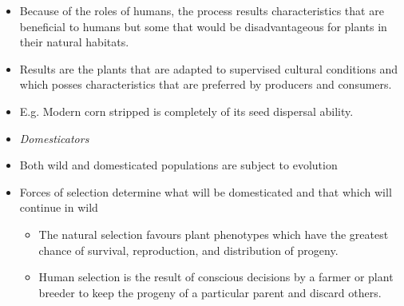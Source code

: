 \documentclass[11pt,ignorenonframetext,aspectratio=169]{beamer}
\providecommand{\tightlist}{%
  \setlength{\itemsep}{0pt}\setlength{\parskip}{0pt}}
\begin{document}
\begin{frame}{}
\protect\hypertarget{section-2}{}
\begin{itemize}
\tightlist
\item
  Because of the roles of humans, the process results characteristics
  that are beneficial to humans but some that would be disadvantageous
  for plants in their natural habitats.
\item
  Results are the plants that are adapted to supervised cultural
  conditions and which posses characteristics that are preferred by
  producers and consumers.
\item
  E.g. Modern corn stripped is completely of its seed dispersal ability.
\item
  \emph{Domesticators}
\item
  Both wild and domesticated populations are subject to evolution
\item
  Forces of selection determine what will be domesticated and that which
  will continue in wild

  \begin{itemize}
  \tightlist
  \item
    The natural selection favours plant phenotypes which have the
    greatest chance of survival, reproduction, and distribution of
    progeny.
  \item
    Human selection is the result of conscious decisions by a farmer or
    plant breeder to keep the progeny of a particular parent and discard
    others.
  \end{itemize}
\end{itemize}
\end{frame}
\end{document}

